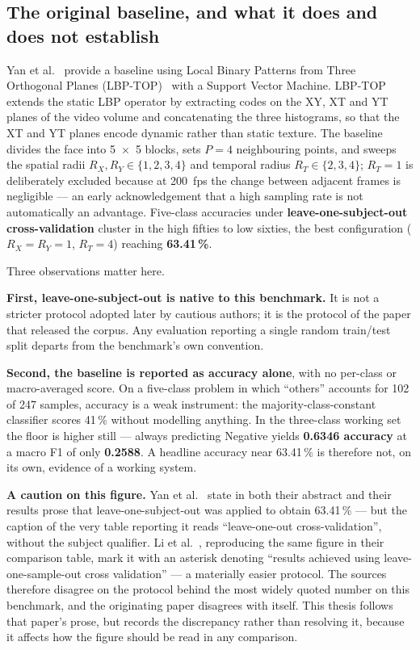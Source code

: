 \subsection{The original baseline, and what it does and does not establish}
\label{sec:original-baseline}

Yan et al.~\cite{yan2014} provide a baseline using Local Binary Patterns from Three Orthogonal Planes (LBP-TOP)~\cite{zhaoG2007} with a Support Vector Machine. LBP-TOP extends the static LBP operator by extracting codes on the XY, XT and YT planes of the video volume and concatenating the three histograms, so that the XT and YT planes encode dynamic rather than static texture. The baseline divides the face into 5~$\times$~5 blocks, sets $P = 4$ neighbouring points, and sweeps the spatial radii $R_X, R_Y \in \{1,2,3,4\}$ and temporal radius $R_T \in \{2,3,4\}$; $R_T = 1$ is deliberately excluded because at 200~fps the change between adjacent frames is negligible --- an early acknowledgement that a high sampling rate is not automatically an advantage. Five-class accuracies under \textbf{leave-one-subject-out cross-validation} cluster in the high fifties to low sixties, the best configuration ($R_X = R_Y = 1$, $R_T = 4$) reaching \textbf{63.41\,\%}.

Three observations matter here.

\textbf{First, leave-one-subject-out is native to this benchmark.} It is not a stricter protocol adopted later by cautious authors; it is the protocol of the paper that released the corpus. Any evaluation reporting a single random train/test split departs from the benchmark's own convention.

\textbf{Second, the baseline is reported as accuracy alone}, with no per-class or macro-averaged score. On a five-class problem in which ``others'' accounts for 102 of 247 samples, accuracy is a weak instrument: the majority-class-constant classifier scores 41\,\% without modelling anything. In the three-class working set the floor is higher still --- always predicting Negative yields \textbf{0.6346 accuracy} at a macro F1 of only \textbf{0.2588}. A headline accuracy near 63.41\,\% is therefore not, on its own, evidence of a working system.

\textbf{A caution on this figure.} Yan et al.~\cite{yan2014} state in both their abstract and their results prose that leave-one-subject-out was applied to obtain 63.41\,\% --- but the caption of the very table reporting it reads ``leave-one-out cross-validation'', without the subject qualifier. Li et al.~\cite{liX2018}, reproducing the same figure in their comparison table, mark it with an asterisk denoting ``results achieved using leave-one-sample-out cross validation'' --- a materially easier protocol. The sources therefore disagree on the protocol behind the most widely quoted number on this benchmark, and the originating paper disagrees with itself. This thesis follows that paper's prose, but records the discrepancy rather than resolving it, because it affects how the figure should be read in any comparison.

